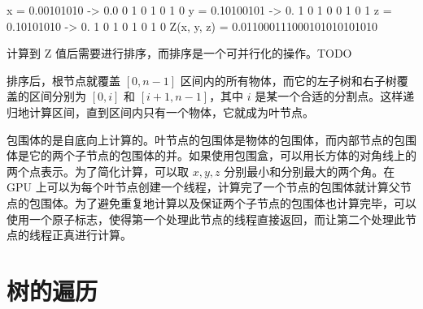 \begin{codeblock}
                        x = 0.00101010 -> 0.0  0  1  0  1  0  1  0
                        y = 0.10100101 -> 0. 1  0  1  0  0  1  0  1
                        z = 0.10101010 -> 0.  1  0  1  0  1  0  1  0
                             Z(x, y, z) = 0.011000111000101010101010
\end{codeblock}

计算到 Z 值后需要进行排序，而排序是一个可并行化的操作。TODO

排序后，根节点就覆盖 $[0, n-1]$ 区间内的所有物体，而它的左子树和右子树覆盖的区间分别为 $[0, i]$ 和 $[i+1,n-1]$，其中 $i$ 是某一个合适的分割点。这样递归地计算区间，直到区间内只有一个物体，它就成为叶节点。

包围体的是自底向上计算的。叶节点的包围体是物体的包围体，而内部节点的包围体是它的两个子节点的包围体的并。如果使用包围盒，可以用长方体的对角线上的两个点表示。为了简化计算，可以取 $x,y,z$ 分别最小和分别最大的两个角。在 GPU 上可以为每个叶节点创建一个线程，计算完了一个节点的包围体就计算父节点的包围体。为了避免重复地计算以及保证两个子节点的包围体也计算完毕，可以使用一个原子标志，使得第一个处理此节点的线程直接返回，而让第二个处理此节点的线程正真进行计算。

\section{树的遍历}


